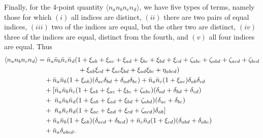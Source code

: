 \documentclass{article}
\newcommand{\nbar}{\bar{n}}
\begin{document}
Finally, for the 4-point quantity $\langle n_a n_b n_c n_d \rangle$, we have
five types of terms, namely those for which $(i)$ all indices are distinct,
$(ii)$ there are two pairs of equal indices, $(iii)$ two of the indices are
equal, but the other two are distinct, $(iv)$ three of the indices are equal,
distinct from the fourth, and $(v)$ all four indices are equal.  Thus
\begin{align}
    \langle n_a n_b n_c n_d \rangle
        &= \nbar_a \nbar_b \nbar_c \nbar_d(1 + \xi_{ab} + \xi_{ac} + \xi_{ad} + \xi_{bc} + \xi_{bd} + \xi_{cd} + \zeta_{abc} + \zeta_{abd} + \zeta_{acd} + \zeta_{bcd} \notag \\
        &\qquad\qquad\qquad + \xi_{ab}\xi_{cd} + \xi_{ac}\xi_{bd} + \xi_{ad}\xi_{bc} + \eta_{abcd}) \notag \\
        &\quad + \nbar_a \nbar_b (1 + \xi_{ab}) (\delta_{ac} \delta_{bd} + \delta_{ad} \delta_{bc}) + \nbar_a \nbar_c (1 + \xi_{ac}) \delta_{ab} \delta_{cd} \notag \\
        &\quad + [\nbar_a \nbar_b \nbar_c (1 + \xi_{ab} + \xi_{ac} + \xi_{bc} + \zeta_{abc}) (\delta_{ad} + \delta_{bd} + \delta_{cd}) \notag \\
        &\quad + \;\nbar_a \nbar_b \nbar_d (1 + \xi_{ab} + \xi_{ad} + \xi_{bd} + \zeta_{abd}) (\delta_{ac} + \delta_{bc}) \notag \\
        &\quad + \;\nbar_a \nbar_c \nbar_d (1 + \xi_{ac} + \xi_{ad} + \xi_{cd} + \zeta_{acd}) \delta_{ab} ] \notag \\
        &\quad + \nbar_a \nbar_b (1 + \xi_{ab}) (\delta_{acd} + \delta_{bcd}) + \nbar_c \nbar_d (1 + \xi_{cd}) (\delta_{abd} + \delta_{abc}) \notag \\
        &\quad + \nbar_a \delta_{abcd}.
\end{align}
\end{document}

